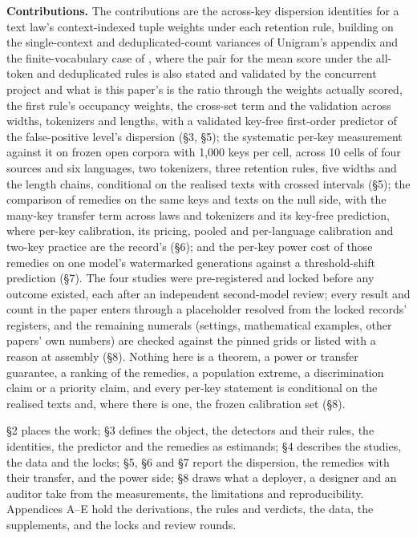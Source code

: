 \documentclass[11pt,letterpaper]{article}
\begin{document}
\textbf{Contributions.} The contributions are the across-key dispersion identities for a text law's context-indexed tuple weights under each retention rule, building on the single-context and deduplicated-count variances of Unigram's appendix \citep{zhao2024unigram} and the finite-vocabulary case of \citet{jovanovic2025image}, where the pair for the mean score under the all-token and deduplicated rules is also stated and validated by the concurrent project \citep{yukhimchuk2026keylottery} and what is this paper's is the ratio through the weights actually scored, the first rule's occupancy weights, the cross-set term and the validation across widths, tokenizers and lengths, with a validated key-free first-order predictor of the false-positive level's dispersion (\S{}3, \S{}5); the systematic per-key measurement against it on frozen open corpora with 1,000 keys per cell, across 10 cells of four sources and six languages, two tokenizers, three retention rules, five widths and the length chains, conditional on the realised texts with crossed intervals (\S{}5); the comparison of remedies on the same keys and texts on the null side, with the many-key transfer term across laws and tokenizers and its key-free prediction, where per-key calibration, its pricing, pooled and per-language calibration and two-key practice are the record's \citep{genhatharan2026nominal, gloaguen2026automark, aremu2026activation, xie2025classroom, delbianco2026compliance, nemecek2026crosslingual, lichen2026chainmark, xlr8harder2026synthid} (\S{}6); and the per-key power cost of those remedies on one model's watermarked generations against a threshold-shift prediction (\S{}7). The four studies were pre-registered and locked before any outcome existed, each after an independent second-model review; every result and count in the paper enters through a placeholder resolved from the locked records' registers, and the remaining numerals (settings, mathematical examples, other papers' own numbers) are checked against the pinned grids or listed with a reason at assembly (\S{}8). Nothing here is a theorem, a power or transfer guarantee, a ranking of the remedies, a population extreme, a discrimination claim or a priority claim, and every per-key statement is conditional on the realised texts and, where there is one, the frozen calibration set (\S{}8).

\S{}2 places the work; \S{}3 defines the object, the detectors and their rules, the identities, the predictor and the remedies as estimands; \S{}4 describes the studies, the data and the locks; \S{}5, \S{}6 and \S{}7 report the dispersion, the remedies with their transfer, and the power side; \S{}8 draws what a deployer, a designer and an auditor take from the measurements, the limitations and reproducibility. Appendices A--E hold the derivations, the rules and verdicts, the data, the supplements, and the locks and review rounds.
\end{document}
